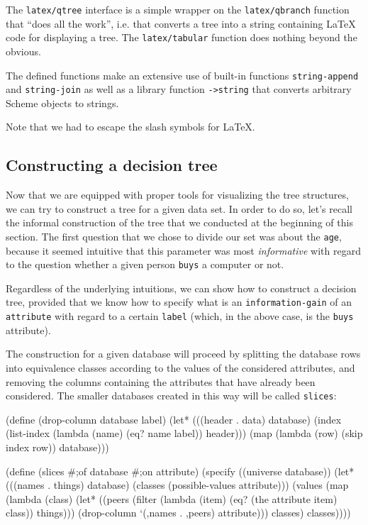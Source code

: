 The \texttt{latex/qtree} interface is a simple wrapper on the
\texttt{latex/qbranch} function that ``does all the work'', i.e.
that converts a tree into a string containing \LaTeX{} code
for displaying a tree. The \texttt{latex/tabular} function
does nothing beyond the obvious.

The defined functions make an extensive use of built-in functions
\texttt{string\--append} and \texttt{string\--join} as well as
a library function \texttt{->string} that converts arbitrary
Scheme objects to strings.

Note that we had to escape the slash symbols for \LaTeX{}.

\subsection{Constructing a decision tree}

Now that we are equipped with proper tools for visualizing
the tree structures, we can try to construct a tree for
a given data set. In order to do so, let's recall the informal
construction of the tree that we conducted at the beginning
of this section. The first question that we chose to divide
our set was about the \texttt{age}, because it seemed
intuitive that this parameter was most \textit{informative}
with regard to the question whether a given person \texttt{buys}
a computer or not.

Regardless of the underlying intuitions, we can show how to
construct a decision tree, provided that we know how to
specify what is an \texttt{information\--gain} of an
\texttt{attribute} with regard to a certain \texttt{label}
(which, in the above case, is the \texttt{buys} attribute).

The construction for a given database will proceed by
splitting the database rows into equivalence classes
according to the values of the considered attributes,
and removing the columns containing the attributes that
have already been considered. The smaller databases
created in this way will be called \texttt{slices}:

\begin{Snippet}
(define (drop-column database label)
  (let* (((header . data) database)
	 (index (list-index (lambda (name) (eq? name label)) header)))
    (map (lambda (row)
	   (skip index row))
	 database)))
\end{Snippet}
\begin{Snippet}
(define (slices #;of database #;on attribute)
  (specify ((universe database))
    (let* (((names . things) database)
           (classes (possible-values attribute)))
      (values
       (map (lambda (class)
              (let* ((peers (filter (lambda (item)
                                      (eq? (the attribute item)
                                           class))
                                    things)))
                (drop-column `(,names . ,peers) attribute)))
            classes)
       classes))))
\end{Snippet}

